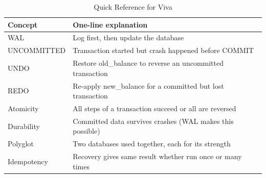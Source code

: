 \begin{table}[H]
\centering
\caption{Quick Reference for Viva}
\begin{tabularx}{\textwidth}{lX}
\toprule
\textbf{Concept} & \textbf{One-line explanation} \\
\midrule
WAL & Log first, then update the database \\
UNCOMMITTED & Transaction started but crash happened before COMMIT \\
UNDO & Restore old\_balance to reverse an uncommitted transaction \\
REDO & Re-apply new\_balance for a committed but lost transaction \\
Atomicity & All steps of a transaction succeed or all are reversed \\
Durability & Committed data survives crashes (WAL makes this possible) \\
Polyglot & Two databases used together, each for its strength \\
Idempotency & Recovery gives same result whether run once or many times \\
\bottomrule
\end{tabularx}
\end{table}

